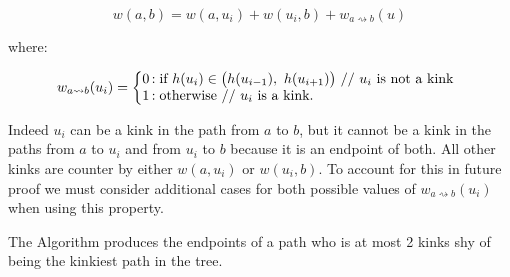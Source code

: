     $$w(a, b) = w(a, u_i) + w(u_i, b) + w_{a \rightsquigarrow b}(u)$$
    
   where:
    
   $$
   w_{a \rightsquigarrow b}(u_i) = \left\{
       \begin{array}{@{}l@{\thinspace}l}
           \text{0}  &: \text{if } h(u_i) \in \big(h(u_{i-1}),~h(u_{i+1}) \big) \text{ // $u_i$ is not a kink} \\
           \text{1} &: \text{otherwise // $u_i$ is a kink.} \\
       \end{array}
   \right.
   $$

   Indeed $u_i$ can be a kink in the path from $a$ to $b$, but it cannot be a kink in the paths from $a$ to $u_i$ and from $u_i$ to $b$ because it is an endpoint of both. All other kinks are counter by either $w(a, u_i)$ or $w(u_i, b)$. To account for this in future proof we must consider additional cases for both possible values of $w_{a\rightsquigarrow b}(u_i)$ when using this property.



\begin{lem} The Algorithm produces the endpoints of a path who is at most 2 kinks shy of being the kinkiest path in the tree. \end{lem}


